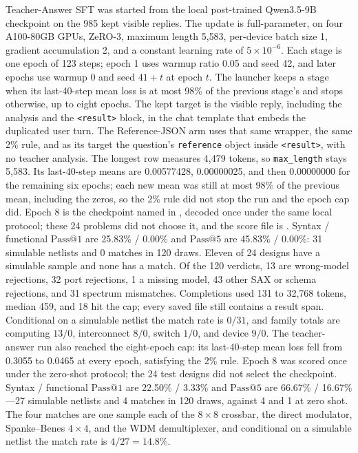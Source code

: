 \documentclass[11pt]{article}
\makeatletter
\newcommand{\passk}[1]{\mathrm{Pass@}#1}
\makeatother
\begin{document}
Teacher-Answer SFT was started from the local post-trained Qwen3.5-9B checkpoint on the 985 kept visible replies.
The update is full-parameter, on four A100-80GB GPUs, ZeRO-3, maximum length 5{,}583, per-device batch size 1, gradient accumulation 2, and a constant learning rate of $5\times10^{-6}$.
Each stage is one epoch of 123 steps; epoch 1 uses warmup ratio 0.05 and seed 42, and later epochs use warmup 0 and seed $41+t$ at epoch $t$.
The launcher keeps a stage when its last-40-step mean loss is at most 98\% of the previous stage's and stops otherwise, up to eight epochs.
The kept target is the visible reply, including the analysis and the \texttt{\textless result\textgreater} block, in the chat template that embeds the duplicated user turn.
The Reference-JSON arm uses that same wrapper, the same 2\% rule, and as its target the question's \texttt{reference} object inside \texttt{\textless result\textgreater}, with no teacher analysis.
The longest row measures 4{,}479 tokens, so \texttt{max\_length} stays 5{,}583.
Its last-40-step means are 0.00577428, 0.00000025, and then 0.00000000 for the remaining six epochs; each new mean was still at most 98\% of the previous mean, including the zeros, so the 2\% rule did not stop the run and the epoch cap did.
Epoch 8 is the checkpoint named in , decoded once under the same local protocol; these 24 problems did not choose it, and the score file is .
Syntax / functional $\passk{1}$ are 25.83\% / 0.00\% and $\passk{5}$ are 45.83\% / 0.00\%: 31 simulable netlists and 0 matches in 120 draws.
Eleven of 24 designs have a simulable sample and none has a match.
Of the 120 verdicts, 13 are wrong-model rejections, 32 port rejections, 1 a missing model, 43 other SAX or schema rejections, and 31 spectrum mismatches.
Completions used 131 to 32{,}768 tokens, median 459, and 18 hit the cap; every saved file still contains a result span.
Conditional on a simulable netlist the match rate is $0/31$, and family totals are computing $13/0$, interconnect $8/0$, switch $1/0$, and device $9/0$.
The teacher-answer run also reached the eight-epoch cap: its last-40-step mean loss fell from 0.3055 to 0.0465 at every epoch, satisfying the 2\% rule. Epoch 8 was scored once under the zero-shot protocol; the 24 test designs did not select the checkpoint.
Syntax / functional $\passk{1}$ are 22.50\% / 3.33\% and $\passk{5}$ are 66.67\% / 16.67\%---27 simulable netlists and 4 matches in 120 draws, against 4 and 1 at zero shot.
The four matches are one sample each of the $8 \times 8$ crossbar, the direct modulator, Spanke--Benes $4 \times 4$, and the WDM demultiplexer, and conditional on a simulable netlist the match rate is $4/27 = 14.8\%$.
\end{document}
